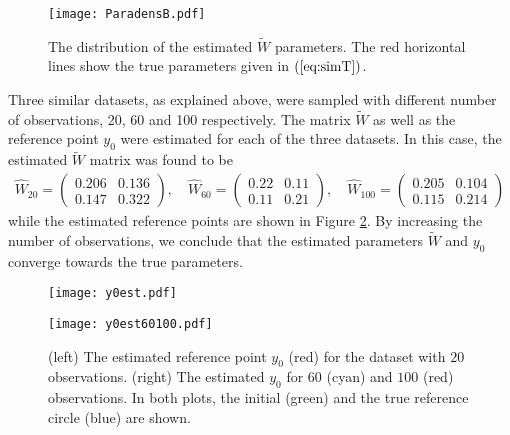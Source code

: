 \documentclass[runningheads,a4paper]{llncs}
\begin{document}


\begin{figure}
\centering
\texttt{[image: ParadensB.pdf]}
\caption{The distribution of the estimated $\tilde{W}$ parameters. The red horizontal lines show the true parameters given in $(\ref{eq:simT})$.}
\label{fig:densFig}
\end{figure}

 Three similar datasets, as explained above, were sampled with different number of observations, 20, 60 and 100 respectively. The matrix $\tilde{W}$ as well as the reference point $y_0$ were estimated for each of the three datasets. In this case, the estimated $\tilde{W}$ matrix was found to be
\begin{align}
\hat{W}_{20} = \begin{pmatrix}
0.206 & 0.136 \\
0.147 & 0.322
\end{pmatrix}, \quad \hat{W}_{60} = \begin{pmatrix}
0.22 & 0.11 \\
0.11 & 0.21
\end{pmatrix}, \quad \hat{W}_{100} = \begin{pmatrix}
0.205 & 0.104 \\
0.115 & 0.214
\end{pmatrix}
\end{align}
while the estimated reference points are shown in Figure \ref{fig:refCirc}. By increasing the number of observations, we conclude that the estimated parameters $\tilde{W}$ and $y_0$ converge towards the true parameters.

\begin{figure}
\centering
\begin{minipage}{0.5\textwidth}
    \texttt{[image: y0est.pdf]}
\end{minipage}%
\begin{minipage}{0.5\textwidth}
    \texttt{[image: y0est60100.pdf]}
\end{minipage}
\caption{(left) The estimated reference point $y_0$ (red) for the dataset with $20$ observations. (right) The estimated $y_0$ for $60$ (cyan) and $100$ (red) observations. In both plots, the initial (green) and the true reference circle (blue) are shown.}
\label{fig:refCirc}
\end{figure}
\end{document}
